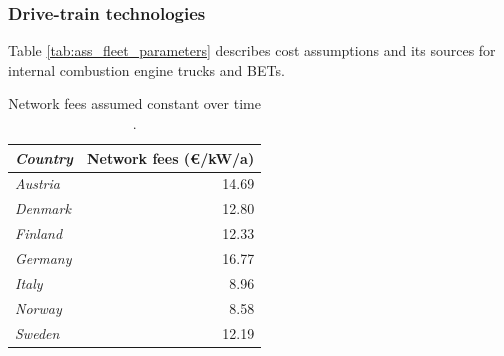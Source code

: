 \documentclass[preprint,10pt,review, authoryear]{elsarticle}
\begin{document}
    \subsubsection{Drive-train technologies}
        Table \ref{tab:ass_fleet_parameters} describes cost assumptions and its sources for internal combustion engine trucks and BETs. 
    \begin{table}[H]
    \centering
    \caption{Network fees assumed constant over time \citep{Lanz2022}.}
    \label{tab:elec_networkfees}
    \begin{tabular}{@{}lr@{}}
    \toprule
    \textit{Country} & \textbf{Network fees (\euro/kW/a)} \\ \midrule
    \textit{Austria}  & 14.69 \\
    \textit{Denmark}  & 12.80 \\
    \textit{Finland}  & 12.33 \\
    \textit{Germany}  & 16.77 \\
    \textit{Italy}    & 8.96  \\
    \textit{Norway}   & 8.58  \\
    \textit{Sweden}   & 12.19 \\ \bottomrule
    \end{tabular}
\end{table}
\end{document}
